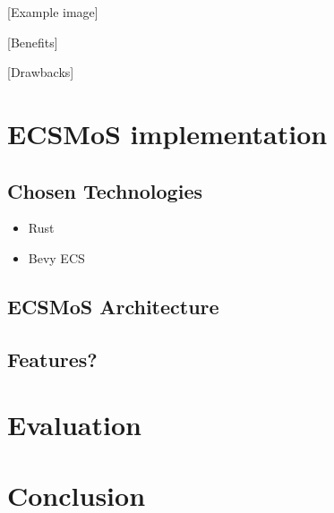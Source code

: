 \documentclass[twoside, 11pt]{article}
\begin{document}
[Example image]

[Benefits]

[Drawbacks]

\section{ECSMoS implementation}

\subsection{Chosen Technologies} \label{chosen_tech}

\begin{itemize}
  \item Rust
  \item Bevy ECS
\end{itemize}

\subsection{ECSMoS Architecture}
\subsection{Features?}

\section{Evaluation}
\section{Conclusion}

\printbibliography
\end{document}
